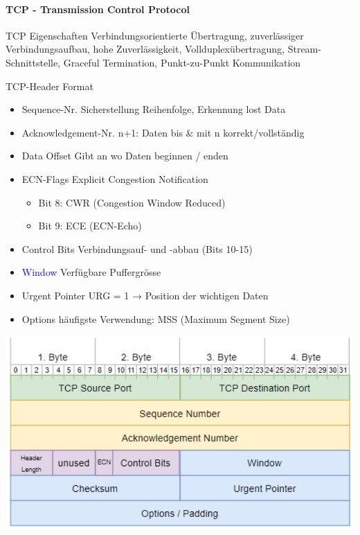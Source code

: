 \paragraph{TCP - Transmission Control Protocol}

\begin{definition}{TCP Eigenschaften} 
    Verbindungsorientierte Übertragung, zuverlässiger Verbindungsaufbau, hohe Zuverlässigkeit, Vollduplexübertragung, Stream-Schnittstelle, Graceful Termination, Punkt-zu-Punkt Kommunikation
\end{definition}

\begin{concept}{TCP-Header Format}
    \begin{itemize}
        \item \textcolor{darkcorn}{Sequence-Nr.} {\small Sicherstellung Reihenfolge, Erkennung lost Data}
        \item \textcolor{darkcorn}{Acknowledgement-Nr.} {\small n+1: Daten bis \& mit n korrekt/vollständig}
        \item \textcolor{darkpurple}{Data Offset} Gibt an wo Daten beginnen / enden
        \item \textcolor{darkpurple}{ECN-Flags} Explicit Congestion Notification
        {\small
        \begin{itemize}
            \item Bit 8: CWR (Congestion Window Reduced)
            \item Bit 9: ECE (ECN-Echo)
        \end{itemize}}
        \item \textcolor{darkpurple}{Control Bits} Verbindungsauf- und -abbau (Bits 10-15)
        \item \textcolor{blue}{Window} Verfügbare Puffergrösse 
        \item \textcolor{darkpurple}{Urgent Pointer} URG = 1 → Position der wichtigen Daten
        \item \textcolor{darkpurple}{Options} häufigste Verwendung: MSS (Maximum Segment Size)
    \end{itemize}
    \includegraphics[width=0.8\linewidth, height=0.36\linewidth]{images/tcpheader.png}
\end{concept}

